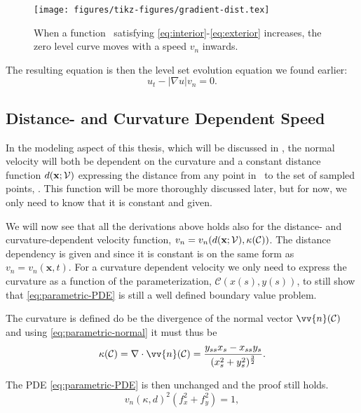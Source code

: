 \begin{figure}
    \centering
    \texttt{[image: figures/tikz-figures/gradient-dist.tex]}
    \caption[Relation between $\nabla u(\mathbf{x}, t)$ and the curve speed]{When a function \uxt\ satisfying \eqref{eq:interior}-\eqref{eq:exterior} increases, the zero level curve moves with a speed $v_n$ inwards.}
    \label{fig:gradient-velocity}
\end{figure}

The resulting equation is then the level set evolution equation we found earlier: 
\begin{equation*}
    u_t - |\nabla u|v_n = 0.    
\end{equation*}

\subsection{Distance- and Curvature Dependent Speed}
In the modeling aspect of this thesis, which will be discussed in , the normal velocity will both be dependent on the curvature and a constant distance function $d(\mathbf{x}; \mathcal{V})$ expressing the distance from any point in \domain\ to the set of sampled points, \pointset. This function will be more thoroughly discussed later, but for now, we only need to know that it is constant and given.

We will now see that all the derivations above holds also for the distance- and curvature-dependent velocity function, $v_n = v_n(d(\textbf{x};\mathcal{V}), \kappa(\mathcal{C}))$. The distance dependency is given and since it is constant is on the same form as $v_n=v_n(\mathbf{x}, t)$. For a curvature dependent velocity we only need to express the curvature as a function of the parameterization, $\mathcal{C}(x(s), y(s))$, to still show that \eqref{eq:parametric-PDE} is still a well defined boundary value problem. 

The curvature is defined do be the divergence of the normal vector $\vv{n}(\mathcal{C})$ \cite{adams2009calculus} and using \eqref{eq:parametric-normal} it must thus be
\begin{equation*}
    \kappa(\mathcal{C}) = \nabla \cdot \vv{n}(\mathcal{C}) = \frac{y_{ss}x_s-x_{ss}y_s}{(x_s^2+y_s^2)^{\frac{3}{2}}}. %
\end{equation*}

The PDE \eqref{eq:parametric-PDE} is then unchanged and the proof still holds.
\begin{equation*}
    v_n(\kappa, d)^2(f_x^2 + f_y^2) = 1,
\end{equation*}

